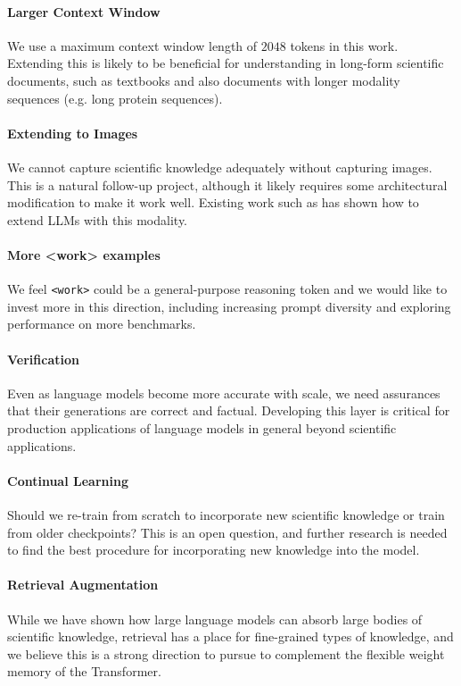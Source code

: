 {\paragraph{Larger Context Window} We use a maximum context window length of $2048$ tokens in this work. Extending this is likely to be beneficial for understanding in long-form scientific documents, such as textbooks and also documents with longer modality sequences (e.g. long protein sequences).

\paragraph{Extending to Images} We cannot capture scientific knowledge adequately without capturing images. This is a natural follow-up project, although it likely requires some architectural modification to make it work well. Existing work such as \citet{Flamingo} has shown how to extend LLMs with this modality.

\paragraph{More <work> examples} We feel \verb|<work>| could be a general-purpose reasoning token and we would like to invest more in this direction, including increasing prompt diversity and exploring performance on more benchmarks. 

\paragraph{Verification} Even as language models become more accurate with scale, we need assurances that their generations are correct and factual. Developing this layer is critical for production applications of language models in general beyond scientific applications.

\paragraph{Continual Learning} Should we re-train from scratch to incorporate new scientific knowledge or train from older checkpoints? This is an open question, and further research is needed to find the best procedure for incorporating new knowledge into the model.

\paragraph{Retrieval Augmentation} While we have shown how large language models can absorb large bodies of scientific knowledge, retrieval has a place for fine-grained types of knowledge, and we believe this is a strong direction to pursue to complement the flexible weight memory of the Transformer.

}
